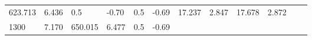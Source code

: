 \documentclass{article}
\begin{document}
\begin{longtable}[]{@{}llllllllllll@{}}
\begin{minipage}[t]{0.06\columnwidth}
623.713\strut
\end{minipage} & \begin{minipage}[t]{0.08\columnwidth}\raggedright\strut
6.436\strut
\end{minipage} & \begin{minipage}[t]{0.03\columnwidth}\raggedright\strut
0.5\strut
\end{minipage} & \begin{minipage}[t]{0.06\columnwidth}\raggedright\strut
-0.70\strut
\end{minipage} & \begin{minipage}[t]{0.03\columnwidth}\raggedright\strut
0.5\strut
\end{minipage} & \begin{minipage}[t]{0.06\columnwidth}\raggedright\strut
-0.69\strut
\end{minipage} & \begin{minipage}[t]{0.06\columnwidth}\raggedright\strut
17.237\strut
\end{minipage} & \begin{minipage}[t]{0.08\columnwidth}\raggedright\strut
2.847\strut
\end{minipage} & \begin{minipage}[t]{0.06\columnwidth}\raggedright\strut
17.678\strut
\end{minipage} & \begin{minipage}[t]{0.09\columnwidth}\raggedright\strut
2.872\strut
\end{minipage}\tabularnewline
\begin{minipage}[t]{0.03\columnwidth}\raggedright\strut
1300\strut
\end{minipage} & \begin{minipage}[t]{0.06\columnwidth}\raggedright\strut
7.170\strut
\end{minipage} & \begin{minipage}[t]{0.06\columnwidth}\raggedright\strut
650.015\strut
\end{minipage} & \begin{minipage}[t]{0.08\columnwidth}\raggedright\strut
6.477\strut
\end{minipage} & \begin{minipage}[t]{0.03\columnwidth}\raggedright\strut
0.5\strut
\end{minipage} & \begin{minipage}[t]{0.06\columnwidth}\raggedright\strut
-0.69\strut
\end{minipage} & \begin{minipage}[t]{0.03\columnwidth}\raggedright\strut

\end{minipage}
\end{longtable}
\end{document}
